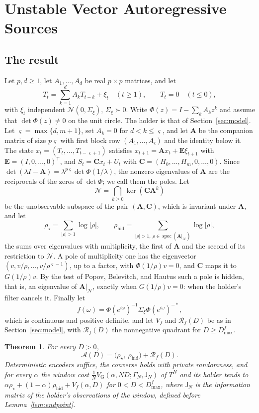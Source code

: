 \documentclass[11pt,onecolumn]{IEEEtran}
\newtheorem{theorem}{Theorem}
\newcommand{\VG}{V_{\mathrm G}}
\newcommand{\bA}{\mathbf A}
\newcommand{\bC}{\mathbf C}
\newcommand{\bE}{\mathbf E}
\newcommand{\rhid}{\rho_{\mathrm{hid}}}
\begin{document}
\section{Unstable Vector Autoregressive Sources}
\label{sec:vector}

\subsection{The result}

Let $p,d\ge1$, let $A_1,\dots,A_d$ be real $p\times p$ matrices, and let
\[
T_t=\sum_{k=1}^dA_kT_{t-k}+\xi_t\quad(t\ge1),\qquad T_t=0\quad(t\le0),
\]
with $\xi_t$ independent $\mathcal N(0,\Sigma_\xi)$, $\Sigma_\xi\succ0$.
Write $\Phi(z)=I-\sum_kA_kz^k$ and assume that $\det\Phi(z)\ne0$ on the
unit circle. The holder is that of Section~\ref{sec:model}. Let
$\varsigma=\max\{d,m+1\}$, set $A_k=0$ for $d<k\le\varsigma$, and let $\bA$
be the companion matrix of size $p\varsigma$ with first block row
$(A_1,\dots,A_\varsigma)$ and the identity below it. The state
$x_t=(T_t,\dots,T_{t-\varsigma+1})$ satisfies $x_{t+1}=\bA x_t+\bE\xi_{t+1}$
with $\bE=(I,0,\dots,0)^{\mathsf T}$, and $S_t=\bC x_t+U_t$ with
$\bC=(H_0,\dots,H_m,0,\dots,0)$. Since
$\det(\lambda I-\bA)=\lambda^{p\varsigma}\det\Phi(1/\lambda)$, the nonzero
eigenvalues of $\bA$ are the reciprocals of the zeros of $\det\Phi$; we
call them the poles. Let
\[
\mathcal N=\bigcap_{k\ge0}\ker(\bC\bA^k)
\]
be the unobservable subspace of the pair $(\bA,\bC)$, which is
invariant under $\bA$, and let
\[
\rho_\star=\sum_{|\rho|>1}\log|\rho|,\qquad
\rhid=\sum_{|\rho|>1,\ \rho\in\operatorname{spec}(\bA|_{\mathcal N})}\log|\rho|,
\]
the sums over eigenvalues with multiplicity, the first of $\bA$ and the
second of its restriction to $\mathcal N$. A pole of multiplicity one
has the eigenvector $(v,v/\rho,\dots,v/\rho^{\varsigma-1})$, up to a
factor, with $\Phi(1/\rho)v=0$, and $\bC$ maps it to $G(1/\rho)v$. By the test of
Popov, Belevitch, and Hautus such a pole is hidden, that is, an
eigenvalue of $\bA|_{\mathcal N}$, exactly when $G(1/\rho)v=0$: when the
holder's filter cancels it. Finally let
\[
f(\omega)=\Phi(e^{i\omega})^{-1}\Sigma_\xi\Phi(e^{i\omega})^{-*},
\]
which is continuous and positive definite, and let $V_f$ and
$\mathcal R_f(D)$ be as in Section~\ref{sec:model}, with
$\mathcal R_f(D)$ the nonnegative quadrant for $D\ge D_{\max}^f$.

\begin{theorem}\label{thm:vector}
For every $D>0$,
\[
\mathcal A(D)=\bigl(\rho_\star,\ \rhid\bigr)+\mathcal R_f(D).
\]
Deterministic encoders suffice, the converse holds with private
randomness, and for every $\alpha$ the window cost
$\tfrac1N\VG(\alpha,ND;\Gamma_N,\mathsf J_N)$ of $T^N$ and its holder
tends to $\alpha\rho_\star+(1-\alpha)\rhid+V_f(\alpha,D)$ for
$0<D<D_{\max}^f$, where $\mathsf J_N$ is the information matrix of the
holder's observations of the window, defined before
Lemma~\ref{lem:endpoint}.
\end{theorem}
\end{document}
